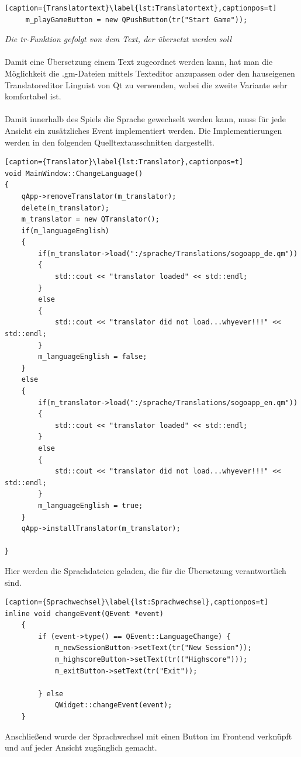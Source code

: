 \documentclass[a4paper]{scrartcl}
\begin{document}
\begin{lstlisting}[caption={Translatortext}\label{lst:Translatortext},captionpos=t]
     m_playGameButton = new QPushButton(tr("Start Game"));
\end{lstlisting}
\textit{Die tr-Funktion gefolgt von dem Text, der übersetzt werden soll}
\\
\\
Damit eine Übersetzung einem Text zugeordnet werden kann, hat man die Möglichkeit die .gm-Dateien mittels Texteditor anzupassen oder den hauseigenen Translatoreditor Linguist von Qt zu verwenden, wobei die zweite Variante sehr komfortabel ist.
\\ 
\\
Damit innerhalb des Spiels die Sprache gewechselt werden kann, muss für jede Ansicht ein zusätzliches Event implementiert werden. Die Implementierungen werden in den folgenden Quelltextausschnitten dargestellt.

\begin{lstlisting}[caption={Translator}\label{lst:Translator},captionpos=t]
void MainWindow::ChangeLanguage()
{
    qApp->removeTranslator(m_translator);
    delete(m_translator);
    m_translator = new QTranslator();
    if(m_languageEnglish)
    {
        if(m_translator->load(":/sprache/Translations/sogoapp_de.qm"))
        {
            std::cout << "translator loaded" << std::endl;
        }
        else
        {
            std::cout << "translator did not load...whyever!!!" << std::endl;
        }
        m_languageEnglish = false;
    }
    else
    {
        if(m_translator->load(":/sprache/Translations/sogoapp_en.qm"))
        {
            std::cout << "translator loaded" << std::endl;
        }
        else
        {
            std::cout << "translator did not load...whyever!!!" << std::endl;
        }
        m_languageEnglish = true;
    }
    qApp->installTranslator(m_translator);

}
\end{lstlisting}
Hier werden die Sprachdateien geladen, die für die Übersetzung verantwortlich sind.

\begin{lstlisting}[caption={Sprachwechsel}\label{lst:Sprachwechsel},captionpos=t]
inline void changeEvent(QEvent *event)
    {
        if (event->type() == QEvent::LanguageChange) {
            m_newSessionButton->setText(tr("New Session"));
            m_highscoreButton->setText(tr(("Highscore")));
            m_exitButton->setText(tr("Exit"));

        } else
            QWidget::changeEvent(event);
    }
\end{lstlisting}
Anschließend wurde der Sprachwechsel mit einen Button im Frontend verknüpft und auf jeder Ansicht zugänglich gemacht.
\end{document}
